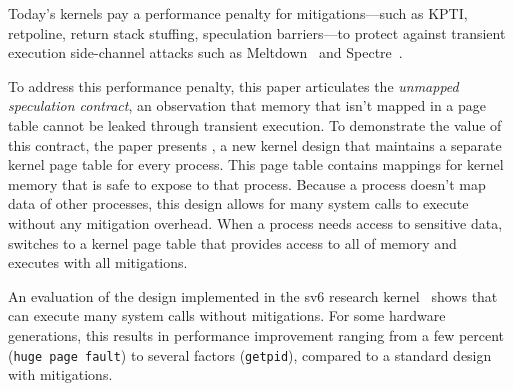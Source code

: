 
Today's kernels pay a performance penalty for mitigations---such as
KPTI, retpoline, return stack stuffing, speculation barriers---to
protect against transient execution side-channel attacks such as
Meltdown~\cite{lipp:meltdown} and Spectre~\cite{kocher:spectre}.


To address this performance penalty, this paper articulates the
\emph{unmapped speculation contract}, an observation that memory that
isn't mapped in a page table cannot be leaked through transient execution.
To demonstrate the value of this contract, the paper presents \sys,
a new kernel design that maintains a separate kernel page table for
every process.  This page table contains mappings for kernel
memory that is safe to expose to that process.
Because a process
doesn't map data of other processes, this design allows for many system
calls to execute without any mitigation overhead. When a process needs
access to sensitive data, \sys switches to a kernel page table that
provides access to all of memory and executes with all mitigations.

An evaluation of the \sys design implemented in the sv6 research
kernel~\cite{clements:sc} shows that \bench~\cite{lebench} can execute many system
calls without mitigations.  For some hardware generations, this results
in performance improvement ranging from a few percent (\texttt{huge page
fault}) to several factors (\texttt{getpid}), compared to a standard
design with mitigations.
